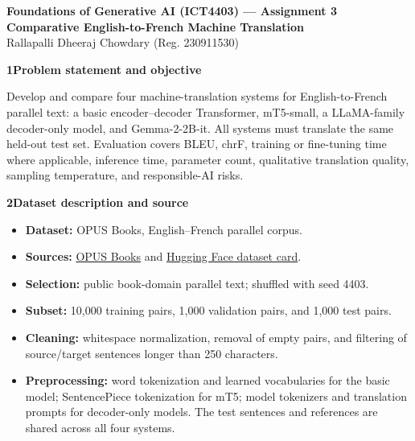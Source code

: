 \documentclass[10pt]{article}
\newcommand{\sectiontitle}[1]{\par\vspace{5pt}\textbf{\large #1}\vspace{2pt}\par}
\begin{document}
\begin{center}
{\Large \textbf{Foundations of Generative AI (ICT4403) --- Assignment 3}}\\
\textbf{Comparative English-to-French Machine Translation}\\[6pt]
Rallapalli Dheeraj Chowdary (Reg. 230911530)
\end{center}

\sectiontitle{1\quad Problem statement and objective}
Develop and compare four machine-translation systems for English-to-French parallel text:
a basic encoder--decoder Transformer, mT5-small, a LLaMA-family decoder-only model, and
Gemma-2-2B-it. All systems must translate the same held-out test set. Evaluation covers
BLEU, chrF, training or fine-tuning time where applicable, inference time, parameter count,
qualitative translation quality, sampling temperature, and responsible-AI risks.

\sectiontitle{2\quad Dataset description and source}
\begin{itemize}
\item \textbf{Dataset:} OPUS Books, English--French parallel corpus.
\item \textbf{Sources:} \href{https://opus.nlpl.eu/legacy/opus-books.php}{OPUS Books}
and \href{https://huggingface.co/datasets/Helsinki-NLP/opus_books}{Hugging Face dataset card}.
\item \textbf{Selection:} public book-domain parallel text; shuffled with seed 4403.
\item \textbf{Subset:} 10,000 training pairs, 1,000 validation pairs, and 1,000 test pairs.
\item \textbf{Cleaning:} whitespace normalization, removal of empty pairs, and filtering
of source/target sentences longer than 250 characters.
\item \textbf{Preprocessing:} word tokenization and learned vocabularies for the basic model;
SentencePiece tokenization for mT5; model tokenizers and translation prompts for decoder-only
models. The test sentences and references are shared across all four systems.
\end{itemize}
\end{document}
